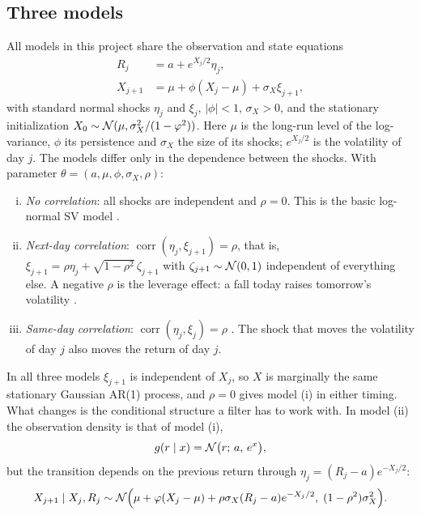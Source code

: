 \subsection{Three models}

All models in this project share the observation and state equations
\begin{align}
        R_j &= a + e^{X_j/2}\eta_j, \label{eq:obs}\\
        X_{j+1} &= \mu + \phi(X_j - \mu) + \sigma_X \xi_{j+1}, \label{eq:state}
\end{align}
with standard normal shocks $\eta_j$ and $\xi_j$, $|\phi| < 1$, $\sigma_X > 0$, and the stationary initialization $X_0 \sim \mathcal{N}(\mu, \sigma_X^2/(1-\varphi^2))$. Here $\mu$ is the long-run level of the log-variance, $\phi$ its persistence and $\sigma_X$ the size of its shocks; $e^{X_j/2}$ is the volatility of day $j$. The models differ only in the dependence between the shocks. With parameter $\theta = (a, \mu, \phi, \sigma_X, \rho)$:
\begin{enumerate}[(i)]
        \item \emph{No correlation}: all shocks are independent and $\rho = 0$. This is the basic log-normal SV model \cite{kimShephardChib1998}.
        \item \emph{Next-day correlation}: $\operatorname{corr}(\eta_j, \xi_{j+1}) = \rho$, that is, $\xi_{j+1} = \rho\eta_j + \sqrt{1-\rho^2}\,\zeta_{j+1}$ with $\zeta_{j+1} \sim \mathcal{N}(0,1)$ independent of everything else. A negative $\rho$ is the leverage effect: a fall today raises tomorrow's volatility \cite{harveyShephard1996, yu2005, omoriEtAl2007}.
        \item \emph{Same-day correlation}: $\operatorname{corr}(\eta_j, \xi_j) = \rho$ \cite{jacquierPolsonRossi2004}. The shock that moves the volatility of day $j$ also moves the return of day $j$.
\end{enumerate}
In all three models $\xi_{j+1}$ is independent of $X_j$, so $X$ is marginally the same stationary Gaussian AR(1) process, and $\rho = 0$ gives model (i) in either timing. What changes is the conditional structure a filter has to work with. In model (ii) the observation density is that of model (i),
\begin{equation}
        g(r \mid x) = \mathcal{N}\big(r;\, a,\, e^{x}\big),
        \label{eq:g_i}
\end{equation}
but the transition depends on the previous return through $\eta_j = (R_j - a)e^{-X_j/2}$:
\begin{equation}
        X_{j+1} \mid X_j, R_j \sim \mathcal{N}\Big(\mu + \varphi(X_j - \mu) + \rho\sigma_X(R_j - a)e^{-X_j/2},\; (1-\rho^2)\sigma_X^2\Big).
        \label{eq:trans_ii}
\end{equation}
